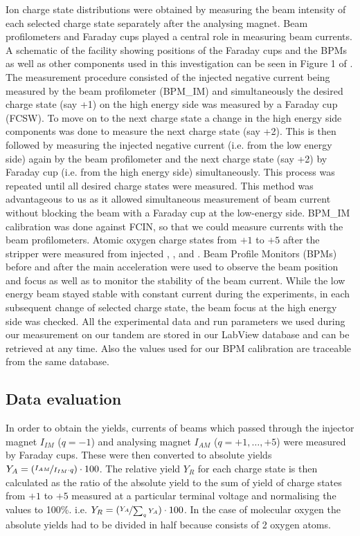 \documentclass[a4paper,fleqn,review]{cas-sc}
\begin{document}
Ion charge state distributions were obtained by measuring the beam intensity of each selected charge state separately after the analysing magnet. Beam profilometers and Faraday cups played a central role in measuring beam currents.  A schematic of the facility showing  positions of the Faraday cups and the BPMs as well as other components used in this investigation can be seen in Figure 1 of \cite{gonsalves2020charge}. The measurement procedure consisted of the  injected negative current being measured by the beam profilometer (BPM\_IM) and simultaneously the desired charge state  (say +1) on the high energy side was measured by a Faraday cup (FCSW). To move on to the next charge state  a change in the high energy side components was done to measure the next charge state (say +2). This is then followed by measuring the injected negative current (i.e. from the low energy side) again by the beam profilometer and the next charge state (say +2) by Faraday cup (i.e. from the high energy side) simultaneously. This process was repeated until all desired charge states were measured. This method was advantageous to us as it allowed simultaneous measurement of beam current without blocking the beam with a Faraday cup at the low-energy side. BPM\_IM calibration was done against FCIN, so that we could measure currents with the beam profilometers. Atomic oxygen charge states from $+1$ to $+5$ after the stripper were measured from injected , , and . Beam Profile Monitors (BPMs) before and after the main acceleration were used to observe the beam position and focus as well as to monitor the stability of the beam current. While the low energy beam stayed stable with constant current during the experiments, in each subsequent change of selected charge state, the beam focus at the high energy side was checked. All the experimental data and run parameters we used during our measurement on our tandem are stored in our LabView database and can be retrieved at any time. Also the values used for our BPM calibration are traceable from the same database.  


\subsection{Data evaluation}
In order to obtain the yields, currents of beams which passed through the injector magnet $I_{IM}$ ($q = -1$) and analysing magnet $I_{AM}$ ($q = +1,\dots,+5$) were measured by Faraday cups. These were then converted to absolute yields  \( Y_{A} = (\nicefrac{I_{AM}}{I_{IM} \cdot q}) \cdot 100\).  The relative yield $Y_{R}$ for each charge state is then calculated as the ratio of the absolute yield to the sum of yield of charge states from $+1$ to $+5$ measured at a particular terminal voltage and normalising the values to 100\%. i.e. \( Y_{R} = (\nicefrac{Y_{A}}{\sum_{q}Y_{A}}) \cdot 100\). In the case of molecular oxygen  the absolute yields had to be divided in half because  consists of 2 oxygen atoms.   
\end{document}
